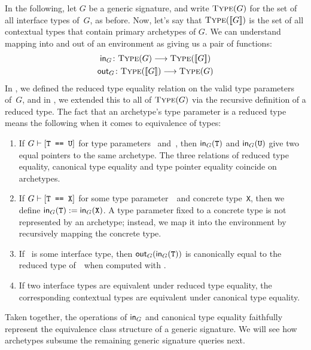 \documentclass[../generics]{subfiles}
\begin{document}
In the following, let $G$ be a generic signature, and write $\textsc{Type}({G})$ for the set of all interface types of~$G$, as before. Now, let's say that $\textsc{Type}({[\![G]\!]})$ is the set of all contextual types that contain primary archetypes of $G$. We can understand mapping into and out of an environment as giving us a pair of functions:
\begin{gather*}
\mathsf{in}_G\colon\textsc{Type}({G})\longrightarrow\textsc{Type}({[\![G]\!]})\\
\mathsf{out}_G\colon\textsc{Type}({[\![G]\!]})\longrightarrow\textsc{Type}({G})
\end{gather*}
In , we defined the reduced type equality relation on the valid type parameters of~$G$, and in , we extended this to all of $\textsc{Type}({G})$ via the recursive definition of a reduced type. The fact that an archetype's type parameter is a reduced type means the following when it comes to equivalence of types:
\begin{enumerate}
\item If $G\vdash[\texttt{T == U}]$ for type parameters \tT~and~\tU, then $\mathsf{in}_G(\texttt{T})$ and $\mathsf{in}_G(\texttt{U})$ give two equal pointers to the same archetype. The three relations of reduced type equality, canonical type equality and type pointer equality coincide on archetypes.

\item If $G\vdash[\texttt{T == X}]$ for some type parameter~\tT\ and concrete type~\texttt{X}, then we define $\mathsf{in}_G(\texttt{T}):=\mathsf{in}_G(\texttt{X})$. A type parameter fixed to a concrete type is not represented by an archetype; instead, we map it into the environment by recursively mapping the concrete type.

\item If \tT\ is some interface type, then $\mathsf{out}_G(\mathsf{in}_G(\texttt{T}))$ is canonically equal to the reduced type of~\tT\ when computed with .

\item If two interface types are equivalent under reduced type equality, the corresponding contextual types are equivalent under canonical type equality.
\end{enumerate}
Taken together, the operations of $\mathsf{in}_G$ and canonical type equality faithfully represent the equivalence class structure of a generic signature. We will see how archetypes subsume the remaining generic signature queries next.
\end{document}
